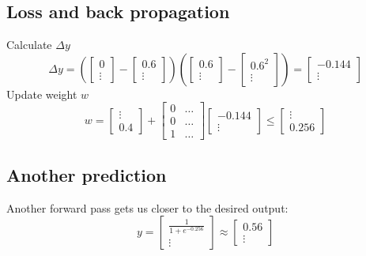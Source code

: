 \documentclass[10pt,a4paper]{article}
\begin{document}
\subsection{Loss and back propagation}
Calculate $\Delta{y}$
\begin{equation}
	\Delta{y} = (
	\begin{bmatrix}
		0 \\
		\vdots
	\end{bmatrix}
	-
	\begin{bmatrix}
		0.6 \\
		\vdots
	\end{bmatrix}
	)(
	\begin{bmatrix}
		0.6 \\
		\vdots
	\end{bmatrix}
	-
	\begin{bmatrix}
		0.6^2 \\
		\vdots
	\end{bmatrix}
	) =
	\begin{bmatrix}
		-0.144 \\
		\vdots
	\end{bmatrix}
\end{equation}
Update weight $w$
\begin{equation}
	w =
	\begin{bmatrix}
		\vdots \\
		0.4
	\end{bmatrix}
	+
	\begin{bmatrix}
		0 & \ldots \\
		0 & \ldots \\
		1 & \ldots
	\end{bmatrix}
	\begin{bmatrix}
		-0.144 \\
		\vdots
	\end{bmatrix}
	\leq
	\begin{bmatrix}
		\vdots \\
		0.256
	\end{bmatrix}
\end{equation}

\subsection{Another prediction}
Another forward pass gets us closer to the desired output:
\begin{equation}
	y =
	\begin{bmatrix}
		\frac{1}{1+e^{-0.256}} \\
		\vdots
	\end{bmatrix}
	\approx
	\begin{bmatrix}
		0.56 \\
		\vdots
	\end{bmatrix}
\end{equation}
\end{document}
